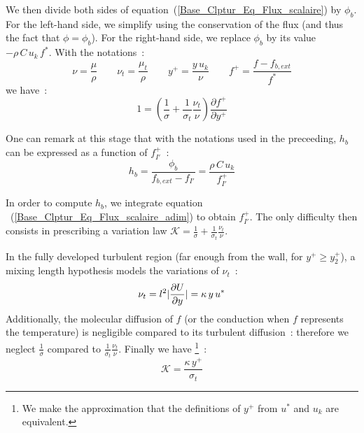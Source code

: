 We then divide both sides of equation~(\ref{Base_Clptur_Eq_Flux_scalaire})
by  $\phi_b$. For the left-hand side, we simplify using the conservation
of the flux (and thus the fact that $\phi=\phi_b$). For the right-hand
side, we replace $\phi_b$ by its value $-\rho\,C\,u_k\,f^*$.
With the notations~:
\begin{equation}
       \nu=\displaystyle\frac{\mu}{\rho}
\qquad \nu_t=\displaystyle\frac{\mu_t}{\rho}
\qquad y^+=\displaystyle\frac{y\,u_k}{\nu}
\qquad f^+=\displaystyle\frac{f-f_{b,ext}}{f^*}
\end{equation}
we have~:
\begin{equation}\label{Base_Clptur_Eq_Flux_scalaire_adim}
1 =  \left(\displaystyle\frac{1}{\sigma}+
              \displaystyle\frac{1}{\sigma_t}\frac{\nu_t}{\nu}\right)
                  \displaystyle\frac{\partial f^+}{\partial y^+}
\end{equation}

One can remark at this stage that with the notations used in the
preceeding,  $h_b$ can be expressed as a function of $f^+_{I'}$~:
\begin{equation}
h_b=\displaystyle\frac{\phi_b}{f_{b,ext}-f_{I'}}=\frac{\rho\,C\,u_k}{f^+_{I'}}
\end{equation}

In order to compute $h_b$, we integrate
equation ~(\ref{Base_Clptur_Eq_Flux_scalaire_adim}) to obtain
$f^+_{I'}$.
The only difficulty then consists in prescribing a variation law
$\mathcal{K}=\displaystyle\frac{1}{\sigma}+
              \displaystyle\frac{1}{\sigma_t}\frac{\nu_t}{\nu}$.


In the fully developed turbulent region
(far enough from the wall, for $y^+\geqslant y^+_2$),
a mixing length hypothesis models the variations of
$\nu_t$~:
\begin{equation}
\nu_t = l^2 \arrowvert \frac{\partial U}{\partial y} \arrowvert =
\kappa \,y\,u^*
\end{equation}
Additionally, the molecular diffusion of $f$
(or the conduction when $f$ represents the temperature)
is negligible compared to its turbulent diffusion~: therefore
we neglect
$\displaystyle\frac{1}{\sigma}$ compared to
$\displaystyle\frac{1}{\sigma_t}\frac{\nu_t}{\nu}$.
Finally we have
\footnote{We make the approximation that the definitions of $y^+$
from $u^*$ and $u_k$ are equivalent.}~:
\begin{equation}
\mathcal{K}= \displaystyle\frac{\kappa \,y^+}{\sigma_t}
\end{equation}


